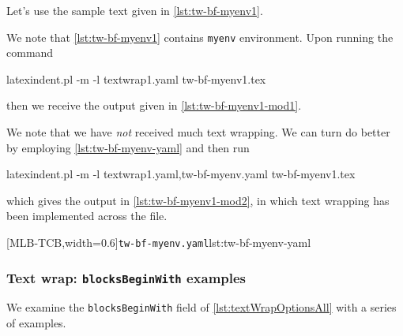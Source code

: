 \documentclass[10pt]{article}
\begin{document}
 \begin{example}
 Let's use the sample text given in \cref{lst:tw-bf-myenv1}.  


 We note that \cref{lst:tw-bf-myenv1} contains \texttt{myenv} environment. Upon running
 the command

 \begin{commandshell}
latexindent.pl -m -l textwrap1.yaml tw-bf-myenv1.tex
\end{commandshell}

 then we receive the output given in \cref{lst:tw-bf-myenv1-mod1}.


 We note that we have \emph{not} received much text wrapping. We can turn do better by
 employing \cref{lst:tw-bf-myenv-yaml} and then run

 \begin{commandshell}
latexindent.pl -m -l textwrap1.yaml,tw-bf-myenv.yaml tw-bf-myenv1.tex
\end{commandshell}

 which gives the output in \cref{lst:tw-bf-myenv1-mod2}, in which text wrapping has been
 implemented across the file.
 \begin{cmhtcbraster}[raster column skip=.01\linewidth,
   raster left skip=-1.5cm,
   raster force size=false,
   raster column 1/.style={add to width=-.1\textwidth},
   raster column 2/.style={add to width=.1\textwidth},
  ]
  [MLB-TCB,width=0.6\linewidth]{\texttt{tw-bf-myenv.yaml}}{lst:tw-bf-myenv-yaml}
 \end{cmhtcbraster}

 \end{example}

\subsubsection{Text wrap: \texttt{blocksBeginWith} examples}
 We examine the \texttt{blocksBeginWith} field of \cref{lst:textWrapOptionsAll} with a
 series of examples. 
\end{document}
